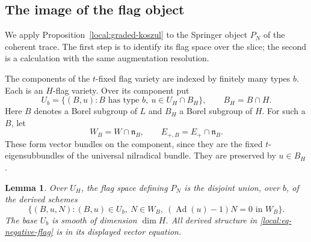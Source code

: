 \documentclass[11pt]{article}
\numberwithin{equation}{section}
\newtheorem{lemma}[theorem]{Lemma}
\theoremstyle{definition}
\theoremstyle{remark}
\newcommand{\Ad}{\operatorname{Ad}}
\begin{document}
\subsection{The image of the flag object}
\label{local:subsec-flags}

We apply Proposition~\ref{local:graded-koszul} to the Springer
object $P_N$ of the coherent trace.  The first step is to identify
its flag space over the slice; the second is a calculation with
the same augmentation resolution.

The components of the $t$-fixed flag variety are indexed by finitely
many types $b$.  Each is an $H$-flag variety.  Over its component put
\begin{equation}\label{local:eq-flag-base}
 U_b=\{(B,u):B\text{ has type }b,\ u\in U_H\cap B_H\},
 \qquad B_H=B\cap H.
\end{equation}
Here $B$ denotes a Borel subgroup of $L$ and $B_H$ a Borel subgroup
of $H$.  For such a $B$, let
\[
 W_B=W\cap\mathfrak n_B,\qquad
 E_{+,B}=E_+\cap\mathfrak n_B.
\]
These form vector bundles on the component, since they are the
fixed $t$-eigensubbundles of the universal nilradical bundle.
They are preserved by $u\in B_H$.

\begin{lemma}\label{local:flag-slice}
Over $U_H$, the flag space defining $P_N$ is the disjoint union,
over $b$, of the derived schemes
\begin{equation}\label{local:eq-negative-flag}
 \{(B,u,N):(B,u)\in U_b,\ N\in W_B,
                   \ (\Ad(u)-1)N=0\text{ in }W_B\}.
\end{equation}
The base $U_b$ is smooth of dimension $\dim H$.  All derived
structure in \eqref{local:eq-negative-flag} is in its displayed
vector equation.
\end{lemma}
\end{document}

